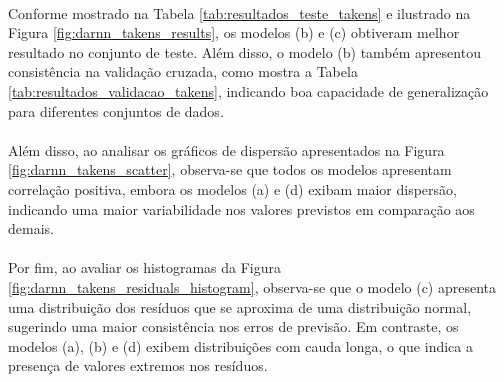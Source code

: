 \paragraph{} Conforme mostrado na Tabela \ref{tab:resultados_teste_takens} e ilustrado na Figura \ref{fig:darnn_takens_results}, os modelos (b) e (c) obtiveram melhor resultado no conjunto de teste. Além disso, o modelo (b) também apresentou consistência na validação cruzada, como mostra a Tabela \ref{tab:resultados_validacao_takens}, indicando boa capacidade de generalização para diferentes conjuntos de dados.
\paragraph{} Além disso, ao analisar os gráficos de dispersão apresentados na Figura \ref{fig:darnn_takens_scatter}, observa-se que todos os modelos apresentam correlação positiva, embora os modelos (a) e (d) exibam maior dispersão, indicando uma maior variabilidade nos valores previstos em comparação aos demais.
\paragraph{} Por fim, ao avaliar os histogramas da Figura \ref{fig:darnn_takens_residuals_histogram}, observa-se que o modelo (c) apresenta uma distribuição dos resíduos que se aproxima de uma distribuição normal, sugerindo uma maior consistência nos erros de previsão. Em contraste, os modelos (a), (b) e (d) exibem distribuições com cauda longa, o que indica a presença de valores extremos nos resíduos.

